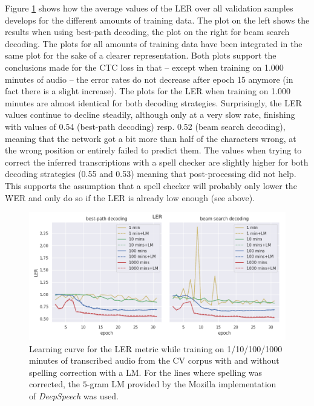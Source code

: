 Figure \ref{lc_ler_cv} shows how the average values of the \ac{LER} over all validation samples develops for the different amounts of training data. The plot on the left shows the results when using best-path decoding, the plot on the right for beam search decoding. The plots for all amounts of training data have been integrated in the same plot for the sake of a clearer representation. Both plots support the conclusions made for the CTC loss in that -- except when training on 1.000 minutes of audio -- the error rates do not decrease after epoch 15 anymore (in fact there is a slight increase). The plots for the \ac{LER} when training on 1.000 minutes are almost identical for both decoding strategies. Surprisingly, the \ac{LER} values continue to decline steadily, although only at a very slow rate, finishing with values of 0.54 (best-path decoding) resp. 0.52 (beam search decoding), meaning that the network got a bit more than half of the characters wrong, at the wrong position or entirely failed to predict them. The values when trying to correct the inferred transcriptions with a spell checker are slightly higher for both decoding strategies (0.55 and 0.53) meaning that post-processing did not help. This supports the assumption that a spell checker will probably only lower the \ac{WER} and only do so if the \ac{LER} is already low enough (see above).

\begin{figure}[h!]
	\includegraphics[width=\linewidth]{./img/lc_ler_cv.png}
	\caption{Learning curve for the \ac{LER} metric while training on 1/10/100/1000 minutes of transcribed audio from the \ac{CV} corpus with and without spelling correction with a \ac{LM}. For the lines where spelling was corrected, the $5$-gram \ac{LM} provided by the Mozilla implementation of \textit{DeepSpeech} was used.}
	\label{lc_ler_cv}
\end{figure}

